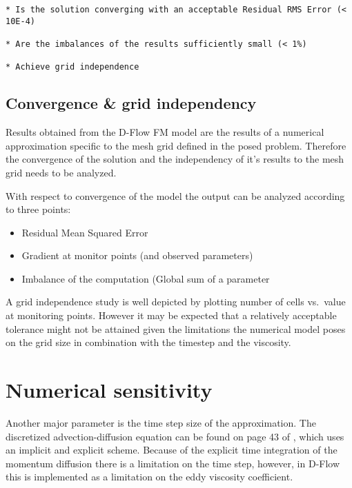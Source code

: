 \begin{verbatim}
* Is the solution converging with an acceptable Residual RMS Error (< 10E-4)

* Are the imbalances of the results sufficiently small (< 1%)

* Achieve grid independence
\end{verbatim}

\subsection{Convergence \& grid independency}\label{convergence-grid-independency}

Results obtained from the D-Flow FM model are the results of a numerical
approximation specific to the mesh grid defined in the posed problem.
Therefore the convergence of the solution and the independency of it's
results to the mesh grid needs to be analyzed.

With respect to convergence of the model the output can be analyzed
according to three points:

\begin{itemize}
\item
  Residual Mean Squared Error
\item
  Gradient at monitor points (and observed parameters)
\item
  Imbalance of the computation (Global sum of a parameter
\end{itemize}

A grid independence study is well depicted by plotting number of cells
vs.~value at monitoring points. However it may be expected that a
relatively acceptable tolerance might not be attained given the
limitations the numerical model poses on the grid size in combination
with the timestep and the viscosity.

\section{Numerical sensitivity}\label{numerical-sensitivity}

Another major parameter is the time step size of the approximation. The
discretized advection-diffusion equation can be found on page 43 of
\citet{DFlowTechMan}, which uses an implicit and explicit scheme.
Because of the explicit time integration of the momentum diffusion there
is a limitation on the time step, however, in D-Flow this is implemented
as a limitation on the eddy viscosity coefficient.

